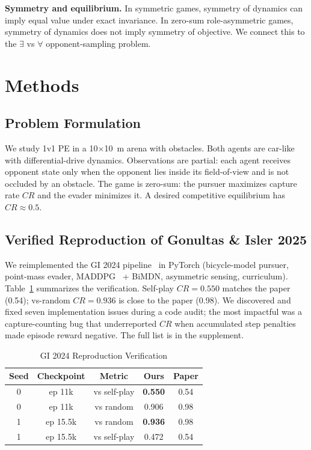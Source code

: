 \documentclass[letterpaper, 10pt, journal]{IEEEtran}
\begin{document}
\textbf{Symmetry and equilibrium.} In symmetric games, symmetry of dynamics can imply equal value under exact invariance. In zero-sum role-asymmetric games, symmetry of dynamics does not imply symmetry of objective. We connect this to the $\exists$ vs $\forall$ opponent-sampling problem.

\section{Methods}
\label{sec:methods}

\subsection{Problem Formulation}
\label{subsec:problem}

We study 1v1 PE in a 10$\times$10~m arena with obstacles. Both agents are car-like with differential-drive dynamics. Observations are partial: each agent receives opponent state only when the opponent lies inside its field-of-view and is not occluded by an obstacle. The game is zero-sum: the pursuer maximizes capture rate $CR$ and the evader minimizes it. A desired competitive equilibrium has $CR \approx 0.5$.

\subsection{Verified Reproduction of Gonultas \& Isler 2025}
\label{subsec:gi_repro}

We reimplemented the GI 2024 pipeline~\cite{gonultas2024carlike} in PyTorch (bicycle-model pursuer, point-mass evader, MADDPG~\cite{lowe2020multiagent} + BiMDN, asymmetric sensing, curriculum). Table~\ref{tab:gi_repro} summarizes the verification. Self-play $CR = 0.550$ matches the paper (0.54); vs-random $CR = 0.936$ is close to the paper (0.98). We discovered and fixed seven implementation issues during a code audit; the most impactful was a capture-counting bug that underreported $CR$ when accumulated step penalties made episode reward negative. The full list is in the supplement.

\begin{table}[h]
\centering
\caption{GI 2024 Reproduction Verification}
\label{tab:gi_repro}
\begin{tabular}{@{}ccccc@{}}
\toprule
Seed & Checkpoint & Metric & Ours & Paper \\
\midrule
0 & ep 11k & vs self-play & \textbf{0.550} & 0.54 \\
0 & ep 11k & vs random & 0.906 & 0.98 \\
1 & ep 15.5k & vs random & \textbf{0.936} & 0.98 \\
1 & ep 15.5k & vs self-play & 0.472 & 0.54 \\
\bottomrule
\end{tabular}
\end{table}
\end{document}
